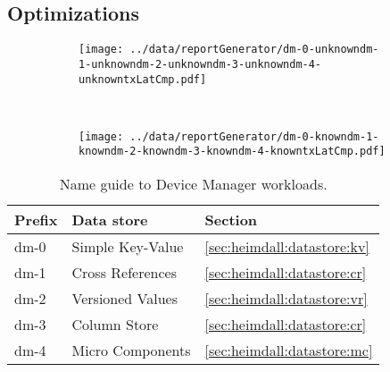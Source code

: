 \documentclass[12pt,openright,twoside]{report}
\begin{document}
\subsection{Optimizations}
\begin{figure}
  \centering
  \begin{subfigure}[b]{0.5\textwidth}
                \centering
                \texttt{[image: ../data/reportGenerator/dm-0-unknowndm-1-unknowndm-2-unknowndm-3-unknowndm-4-unknowntxLatCmp.pdf]}
                \caption{}
                \label{fig:}
        \end{subfigure}%
        ~
        \begin{subfigure}[b]{0.5\textwidth}
                \centering
                \texttt{[image: ../data/reportGenerator/dm-0-knowndm-1-knowndm-2-knowndm-3-knowndm-4-knowntxLatCmp.pdf]}
                \caption{}
                \label{}
        \end{subfigure}
        \caption[Device Manager performance analysis]{}
        \label{fig:dm:performance}
\end{figure}

\begin{table}
\small
\begin{tabular}{lll} 
    Prefix &  Data store & Section\\\toprule
    dm-0 & Simple Key-Value  & \ref{sec:heimdall:datastore:kv}  \\
    dm-1 & Cross References  & \ref{sec:heimdall:datastore:cr} \\
    dm-2 & Versioned Values & \ref{sec:heimdall:datastore:vr} \\
    dm-3 & Column Store & \ref{sec:heimdall:datastore:cr} \\
    dm-4 & Micro Components & \ref{sec:heimdall:datastore:mc} \\ 
  \end{tabular}
  \caption[Name guide to Device Manager workloads]{Name guide to
    Device Manager workloads.}
  \label{table:names:dm}
\end{table}
\end{document}
